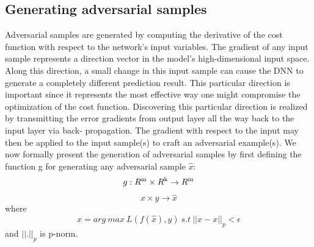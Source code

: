 \documentclass{article}
\begin{document}
	\subsection{Generating adversarial samples}
	Adversarial samples are generated by computing the derivative of the cost function with respect to the network’s input variables. The
	gradient of any input sample represents a direction vector in the model’s high-dimensional input space. Along this direction, a small
	change in this input sample can cause the DNN to generate a completely different prediction result. This particular direction is
	important since it represents the most effective way one might compromise the optimization of the cost function. Discovering this
	particular direction is realized by transmitting the error gradients from output layer all the way back to the input layer via back-
	propagation. The gradient with respect to the input may then be applied to the input sample(s) to craft an adversarial example(s).
	We now formally present the generation of adversarial samples by first defining the function g for generating any adversarial sample $\hat{x}$:
		\begin{equation}
		g : R\textsuperscript{m} \times R\textsuperscript{k} \rightarrow R\textsuperscript{m}
		\end{equation}
		\begin{equation*}
		x \times y \rightarrow \hat{x} 
		\end{equation*} 
		where
		\begin{equation}\label{4}
		\hat{x} = arg \ max \ L(f(\hat{x}), y) \ s.t \ ||\hat{x}-x||_p < \epsilon
		\end{equation} and $||.||_p$ is p-norm.
	
\end{document}
